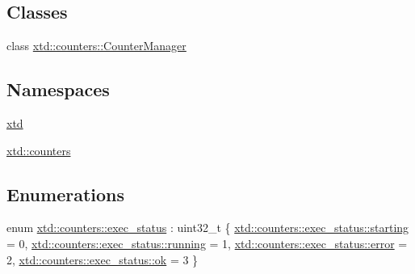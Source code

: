 \subsection*{Classes}
\begin{DoxyCompactItemize}
\item 
class \hyperlink{classxtd_1_1counters_1_1CounterManager}{xtd\+::counters\+::\+Counter\+Manager}
\end{DoxyCompactItemize}
\subsection*{Namespaces}
\begin{DoxyCompactItemize}
\item 
 \hyperlink{namespacextd}{xtd}
\item 
 \hyperlink{namespacextd_1_1counters}{xtd\+::counters}
\end{DoxyCompactItemize}
\subsection*{Enumerations}
\begin{DoxyCompactItemize}
\item 
enum \hyperlink{namespacextd_1_1counters_a408a8b2fd75b44228e1741ac4a32aff8}{xtd\+::counters\+::exec\+\_\+status} \+: uint32\+\_\+t \{ \hyperlink{namespacextd_1_1counters_a408a8b2fd75b44228e1741ac4a32aff8a1ee85f6c60017a7f0646ba8dc5824de6}{xtd\+::counters\+::exec\+\_\+status\+::starting} = 0, 
\hyperlink{namespacextd_1_1counters_a408a8b2fd75b44228e1741ac4a32aff8a75101dcdfc88455bcafc9e53e0b06689}{xtd\+::counters\+::exec\+\_\+status\+::running} = 1, 
\hyperlink{namespacextd_1_1counters_a408a8b2fd75b44228e1741ac4a32aff8acb5e100e5a9a3e7f6d1fd97512215282}{xtd\+::counters\+::exec\+\_\+status\+::error} = 2, 
\hyperlink{namespacextd_1_1counters_a408a8b2fd75b44228e1741ac4a32aff8a444bcb3a3fcf8389296c49467f27e1d6}{xtd\+::counters\+::exec\+\_\+status\+::ok} = 3
 \}
\end{DoxyCompactItemize}
